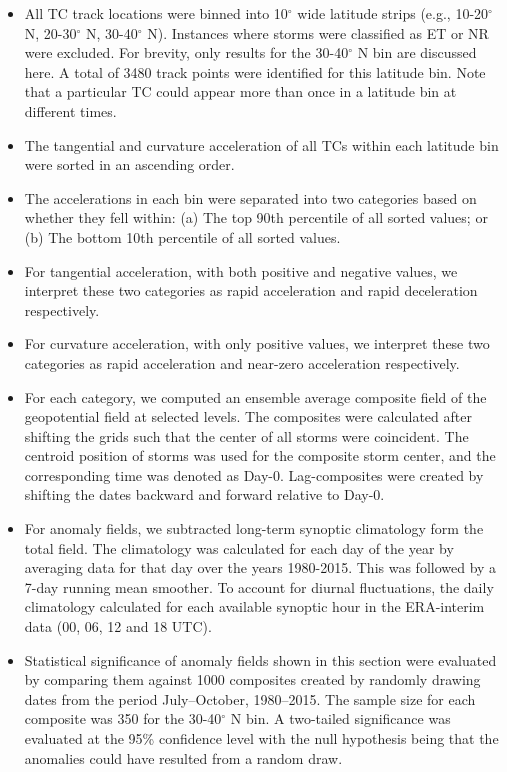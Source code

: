 \documentclass[wcd,manuscript]{copernicus}
\begin{document}
\begin{itemize}
    \item All TC track locations were binned into 10$^\circ$ wide latitude strips (e.g.,  10-20$^\circ$ N, 20-30$^\circ$ N, 30-40$^\circ$ N). Instances where storms were classified as ET or NR were excluded. For brevity, only results for the 30-40$^\circ$ N bin are discussed here. A total of 
    3480 track points were identified for this latitude bin. Note that a particular TC could appear more than once in a latitude bin at different times. 
    
    \item The tangential and curvature acceleration of all TCs within each latitude bin were sorted in an ascending order.

    \item The accelerations in each bin were separated into two categories based on whether they fell within: (a) The top 90th percentile of all sorted values; or (b) The bottom 10th percentile of all sorted values.
    
    \item For tangential acceleration, with both positive and negative values, we interpret these two categories as rapid acceleration and rapid deceleration respectively.
    
    \item For curvature acceleration, with only positive values, we interpret these two categories as rapid acceleration and near-zero acceleration respectively.

    
    \item For each category, we computed an ensemble average composite field of the geopotential field at selected levels. The composites were calculated after shifting the grids such that the center of all storms were coincident. The centroid position of storms was used for the composite storm center, and the corresponding time was denoted as Day-0. Lag-composites were created by shifting the dates backward and forward relative to Day-0.

    \item For anomaly fields, we subtracted long-term synoptic climatology form the total field. The climatology was calculated for each day of the year by averaging data for that day over the years 1980-2015. This was followed by a 7-day running mean smoother. To account for diurnal fluctuations, the daily climatology calculated for each available synoptic hour in the ERA-interim data (00, 06, 12 and 18 UTC).
    
    
    \item Statistical significance of anomaly fields shown in this section were evaluated by comparing them against 1000 composites created by randomly drawing dates from the period July--October, 1980--2015. The sample size for each composite was 350 for the 30-40$^\circ$ N bin. A two-tailed significance was evaluated at the 95\% confidence level with the null hypothesis being that the anomalies could have resulted from a random draw.
    
\end{itemize}
\end{document}
